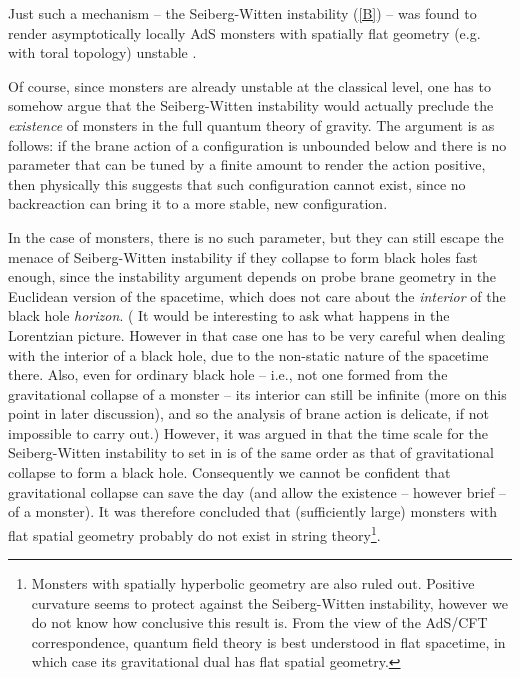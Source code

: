 \documentclass[12pt]{article}
\newcommand{\2}{$^2$}
\newcommand{\3}{$^3$}
\newcommand{\4}{$_4$}
\newcommand{\5}{$_5$}
\begin{document}

Just such a mechanism -- the Seiberg-Witten instability (\ref{B}) -- was found to render asymptotically locally AdS monsters with spatially flat geometry (e.g. with toral topology) unstable \cite{ycmonster}. 




Of course, since monsters are already unstable at the classical level, one has to somehow argue that the Seiberg-Witten instability would actually preclude the \emph{existence} of monsters in the full quantum theory of gravity. The argument is as follows: if the brane action of a configuration is unbounded below and there is no parameter that can be tuned by a finite amount to render the action positive, then physically this suggests that such configuration cannot exist, since no backreaction can bring it to a more stable, new configuration.

In the case of monsters, there is no such parameter, but they can still escape the menace of Seiberg-Witten instability if they collapse to form black holes fast enough, since the instability argument depends on probe brane geometry in the Euclidean version of the spacetime, which does not care about the \emph{interior} of the black hole \emph{horizon}. ({\color{black} It would be interesting to ask what happens in the Lorentzian picture. However in that case one has to be very careful when dealing with the interior of a black hole, due to the non-static nature of the spacetime there. Also, even for ordinary black hole -- i.e., not one formed from the gravitational collapse of a monster -- its interior can still be infinite (more on this point in later discussion), and so the analysis of brane action is delicate, if not impossible to carry out.}) However, it was argued in \cite{ycmonster} that the time scale for the Seiberg-Witten instability to set in is of the same order as that of gravitational collapse to form a black hole. Consequently we cannot be confident that gravitational collapse can save the day (and allow the existence -- however brief -- of a monster). It was therefore concluded that (sufficiently large) monsters with flat spatial geometry probably do not exist in string theory\footnote{Monsters with spatially hyperbolic geometry are also ruled out. Positive curvature seems to protect against the Seiberg-Witten instability, however we do not know how conclusive this result is. From the view of the AdS/CFT correspondence, quantum field theory is best understood in flat spacetime, in which case its gravitational dual has flat spatial geometry.}. 
\end{document}
